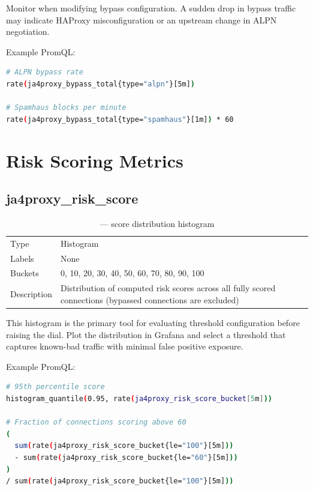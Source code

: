 \begin{notebox}
Monitor  when modifying bypass configuration. A sudden
drop in  bypass traffic may indicate HAProxy misconfiguration or an upstream
change in ALPN negotiation.
\end{notebox}

Example PromQL:
\begin{lstlisting}[language=bash]
# ALPN bypass rate
rate(ja4proxy_bypass_total{type="alpn"}[5m])

# Spamhaus blocks per minute
rate(ja4proxy_bypass_total{type="spamhaus"}[1m]) * 60
\end{lstlisting}

\section{Risk Scoring Metrics}

\subsection{ja4proxy\_risk\_score}

\begin{fullwidth}
\begin{table}[h]
\caption{ — score distribution histogram}
\label{tab:metric-score-hist}
\begin{tabular}{@{}ll@{}}
\toprule
Type & Histogram \\
Labels & None \\
Buckets & 0, 10, 20, 30, 40, 50, 60, 70, 80, 90, 100 \\
Description & Distribution of computed risk scores across all fully scored connections (bypassed connections are excluded) \\
\bottomrule
\end{tabular}
\end{table}
\end{fullwidth}

This histogram is the primary tool for evaluating threshold configuration before raising
the dial. Plot the distribution in Grafana and select a threshold that captures known-bad
traffic with minimal false positive exposure.

Example PromQL:
\begin{lstlisting}[language=bash]
# 95th percentile score
histogram_quantile(0.95, rate(ja4proxy_risk_score_bucket[5m]))

# Fraction of connections scoring above 60
(
  sum(rate(ja4proxy_risk_score_bucket{le="100"}[5m]))
  - sum(rate(ja4proxy_risk_score_bucket{le="60"}[5m]))
)
/ sum(rate(ja4proxy_risk_score_bucket{le="100"}[5m]))
\end{lstlisting}

